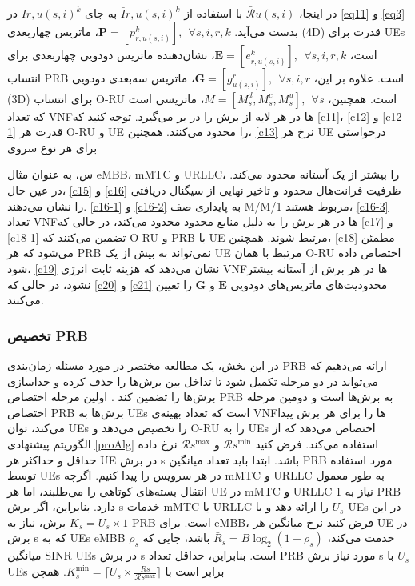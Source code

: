 در اینجا، $\bar{\mathcal{R}}{u{(s,i)}}$ با استفاده از $\bar{I}{r,u(s,i)}^{k}$ به جای $I{r,u(s,i)}^{k}$ در \eqref{eq11} و \eqref{eq3} بدست می‌آید.
 $\boldsymbol{P} =[p_{r,u(s,i)}^{k}], \:\: \forall s , i, r, k $، ماتریس چهاربعدی (4D) قدرت برای UEs است، $\boldsymbol{E} =[e_{r,u(s,i)}^k], \:\: \forall s , i, r, k$، نشان‌دهنده ماتریس دودویی چهاربعدی برای انتساب PRB است. علاوه بر این، $\boldsymbol{G} =[g_{u(s,i)}^r], \:\: \forall s , i, r$، ماتریس سه‌بعدی دودویی (3D) برای انتساب O-RU است. همچنین، $M = [M_s^d, M_s^c, M_s^u], \:\: \forall s$، ماتریسی است که تعداد VNF‌ها در هر لایه از برش را در بر می‌گیرد. توجه کنید که
\eqref{c11}، \eqref{c12} و \eqref{c12-1} قدرت هر O-RU و UE را محدود می‌کنند.
همچنین، \eqref{c13} نرخ هر UE درخواستی برای هر نوع سروی

س، به عنوان مثال eMBB، mMTC و URLLC، را بیشتر از یک آستانه محدود می‌کند. در عین حال،
\eqref{c15} و \eqref{c16} ظرفیت فرانت‌هال محدود و تاخیر نهایی از سیگنال دریافتی را نشان می‌دهند.
\eqref{c16-1} و \eqref{c16-2} به پایداری صف M/M/1 مربوط هستند،
\eqref{c16-3} تعداد VNF‌ها در هر برش را به دلیل منابع محدود محدود می‌کند، در حالی که
\eqref{c17} و \eqref{c18-1} تضمین می‌کنند که O-RU و PRB با UE مرتبط شوند.
همچنین، \eqref{c18} مطمئن می‌شود که هر PRB نمی‌تواند به بیش از یک UE مرتبط با همان O-RU اختصاص داده شود، \eqref{c19} نشان می‌دهد که هزینه ثابت انرژی VNF‌ها در هر برش از آستانه بیشتر نشود، در حالی که \eqref{c20} و \eqref{c21} محدودیت‌های ماتریس‌های دودویی $\boldsymbol{E}$ و $\boldsymbol{G}$ را تعیین می‌کنند.

\subsubsection{تخصیص PRB}\label{prb}
در این بخش، یک مطالعه مختصر در مورد مسئله زمان‌بندی PRB ارائه می‌دهیم که می‌تواند در دو مرحله تکمیل شود تا تداخل بین برش‌ها را حذف کرده و جداسازی برش‌ها را تضمین کند \cite{marabissi2019highly}.
اولین مرحله اختصاص PRB به برش‌ها است و دومین مرحله اختصاص PRB برش‌ها به UEs است که تعداد بهینه‌ی VNF‌ها را برای هر برش پیدا می‌کند، توان UEs را تخصیص می‌دهد و O-RU را به UEs اختصاص می‌دهد که از الگوریتم پیشنهادی \ref{proAlg} استفاده می‌کند.
فرض کنید $\mathcal{R}{{s}}^{\min}$ و $\mathcal{R}{{s}}^{\text{max}}$ نرخ داده حداقل و حداکثر هر UE در برش s باشد.
ابتدا باید تعداد میانگین PRB مورد استفاده توسط UEs در هر سرویس را پیدا کنیم. اگرچه mMTC و URLLC به طور معمول انتقال بسته‌های کوتاهی را می‌طلبند، اما هر UE در mMTC و URLLC نیاز به 1 PRB دارد. بنابراین، اگر برش s خدمات mMTC یا URLLC را ارائه دهد و با $U_s$ UEs در این برش، نیاز به $K_s = U_s \times 1$ PRB است. برای eMBB، فرض کنید نرخ میانگین هر UE در برش s که به UEs eMBB خدمت می‌کند، $\bar{R}_s = B\log_2(1 + \bar{\rho_s})$ باشد، جایی که $\bar{\rho_s}$ میانگین SINR UEs در برش s است.
بنابراین، حداقل تعداد PRB مورد نیاز برش s با $U_s$ UEs برابر است با $K_s^{\min} = \lceil{U_s \times \frac{\bar{R}s}{\mathcal{R}{{s}}^{\text{max}}}}\rceil$. همچن

